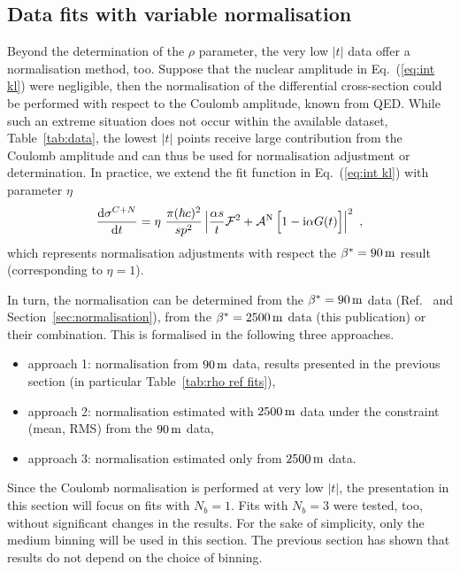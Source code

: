 \subsection{Data fits with variable normalisation}
\label{sec:rho anal norm var}

Beyond the determination of the $\rho$ parameter, the very low $|t|$ data offer a normalisation method, too. Suppose that the nuclear amplitude in Eq.~(\ref{eq:int kl}) were negligible, then the normalisation of the differential cross-section could be performed with respect to the Coulomb amplitude, known from QED. While such an extreme situation does not occur within the available dataset, Table~\ref{tab:data}, the lowest $|t|$ points receive large contribution from the Coulomb amplitude and can thus be used for normalisation adjustment or determination. In practice, we extend the fit function in Eq.~(\ref{eq:int kl}) with parameter $\eta$
\begin{equation}
\label{eq:fit fcn eta}
{\d\sigma^{C+N}\over \d t} = \eta\ {\pi (\hbar c)^2 \over s p^2} \left | {\alpha s\over t} {\cal F}^2
			+ {\cal A}^{\rm N}\, \Big[1 - \I\alpha G(t)\Big] \right |^2\ ,
\end{equation}
which represents normalisation adjustments with respect the $\beta^* = 90\,{\rm m}$ result \cite{totem-13tev-90m} (corresponding to $\eta = 1$).

In turn, the normalisation can be determined from the $\beta^* = 90\,{\rm m}$ data (Ref.~\cite{totem-13tev-90m} and Section~\ref{sec:normalisation}), from the $\beta^* = 2500\,{\rm m}$ data (this publication) or their combination. This is formalised in the following three approaches.
\begin{itemize}[noitemsep,topsep=0pt]
\item approach 1: normalisation from $90\,{\rm m}$ data, results presented in the previous section (in particular Table~\ref{tab:rho ref fits}),
\item approach 2: normalisation estimated with $2500\,{\rm m}$ data under the constraint (mean, RMS) from the $90\,{\rm m}$ data,
\item approach 3: normalisation estimated only from $2500\,{\rm m}$ data.
\end{itemize}

Since the Coulomb normalisation is performed at very low $|t|$, the presentation in this section will focus on fits with $N_b = 1$. Fits with $N_b = 3$ were tested, too, without significant changes in the results. For the sake of simplicity, only the medium binning will be used in this section. The previous section has shown that results do not depend on the choice of binning.

